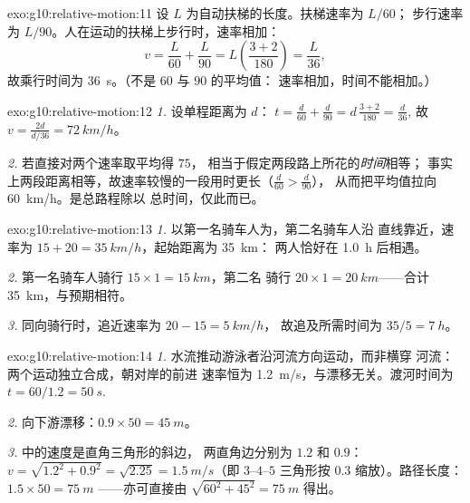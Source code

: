 \begin{solution}{exo:g10:relative-motion:11}
设 $L$ 为自动扶梯的长度。扶梯速率为 $L/60$；
步行速率为 $L/90$。人在运动的扶梯上步行时，速率相加：
\[
v = \frac{L}{60} + \frac{L}{90} = L\left(\frac{3 + 2}{180}\right)
= \frac{L}{36},
\]
故乘行时间为 \qty{36}{s}。（不是 $60$ 与 $90$ 的平均值：
速率相加，时间不能相加。）
\end{solution}

\begin{solution}{exo:g10:relative-motion:12}
\emph{1.} 设单程距离为 $d$：
$t = \frac{d}{60} + \frac{d}{90} = d\,\frac{3 + 2}{180} = \frac{d}{36}$,
故 $v = \frac{2d}{d/36} = \qty{72}{km/h}$。

\emph{2.} 若直接对两个速率取平均得 $75$，
相当于假定两段路上所花的\emph{时间}相等；
事实上两段距离相等，故速率较慢的一段用时更长（$\frac{d}{60} > \frac{d}{90}$），
从而把平均值拉向 \qty{60}{km/h}。是总路程除以
总时间，仅此而已。
\end{solution}

\begin{solution}{exo:g10:relative-motion:13}
\emph{1.} 以第一名骑车人为，第二名骑车人沿
直线靠近，速率为 $15 + 20 = \qty{35}{km/h}$，起始距离为 \qty{35}{km}：
两人恰好在 \qty{1.0}{h} 后相遇。

\emph{2.} 第一名骑车人骑行 $15 \times 1 = \qty{15}{km}$，第二名
骑行 $20 \times 1 = \qty{20}{km}$——合计 \qty{35}{km}，与预期相符。

\emph{3.} 同向骑行时，追近速率为 $20 - 15 = \qty{5}{km/h}$，
故追及所需时间为 $35/5 = \qty{7}{h}$。
\end{solution}

\begin{solution}{exo:g10:relative-motion:14}
\emph{1.} 水流推动游泳者沿河流方向运动，而非横穿
河流：两个运动独立合成，朝对岸的前进
速率恒为 \qty{1.2}{m/s}，与漂移无关。渡河时间为
$t = 60/1.2 = \qty{50}{s}$.

\emph{2.} 向下游漂移：$0.9 \times 50 = \qty{45}{m}$。

\emph{3.} 中的速度是直角三角形的斜边，
两直角边分别为 $1.2$ 和 $0.9$：
$v = \sqrt{1.2^2 + 0.9^2} = \sqrt{2.25} = \qty{1.5}{m/s}$（即 $3$--$4$--$5$
三角形按 $0.3$ 缩放）。路径长度：$1.5 \times 50 = \qty{75}{m}$
——亦可直接由 $\sqrt{60^2 + 45^2} = \qty{75}{m}$ 得出。
\end{solution}


